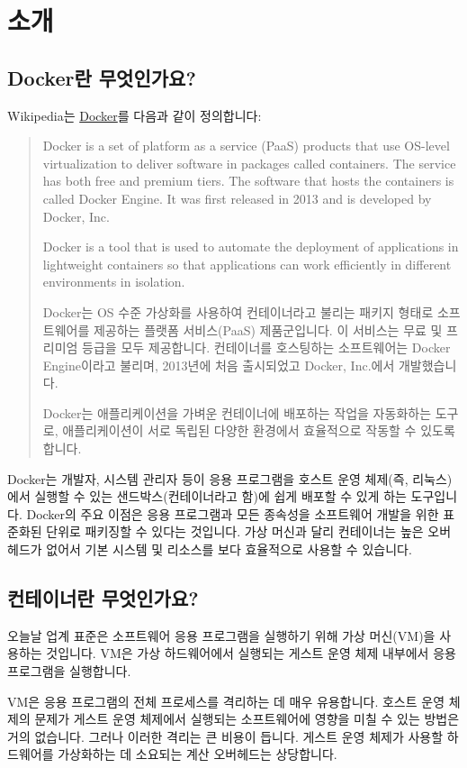 \chapter{소개}
\section{Docker란 무엇인가요?}
Wikipedia는 \href{https://www.docker.com/}{Docker}를 다음과 같이 정의합니다:
\begin{quote}
    Docker is a set of platform as a service (PaaS) products that use OS-level virtualization to deliver software in packages called containers. The service has both free and premium tiers. The software that hosts the containers is called Docker Engine. It was first released in 2013 and is developed by Docker, Inc.

    Docker is a tool that is used to automate the deployment of applications in lightweight containers so that applications can work efficiently in different environments in isolation.

    Docker는 OS 수준 가상화를 사용하여 컨테이너라고 불리는 패키지 형태로 소프트웨어를 제공하는 플랫폼 서비스(PaaS) 제품군입니다. 이 서비스는 무료 및 프리미엄 등급을 모두 제공합니다. 컨테이너를 호스팅하는 소프트웨어는 Docker Engine이라고 불리며, 2013년에 처음 출시되었고 Docker, Inc.에서 개발했습니다.
    
    Docker는 애플리케이션을 가벼운 컨테이너에 배포하는 작업을 자동화하는 도구로, 애플리케이션이 서로 독립된 다양한 환경에서 효율적으로 작동할 수 있도록 합니다.
\end{quote}

Docker는 개발자, 시스템 관리자 등이 응용 프로그램을 호스트 운영 체제(즉, 리눅스)에서 실행할 수 있는 샌드박스(컨테이너라고 함)에 쉽게 배포할 수 있게 하는 도구입니다. Docker의 주요 이점은 응용 프로그램과 모든 종속성을 소프트웨어 개발을 위한 표준화된 단위로 패키징할 수 있다는 것입니다. 가상 머신과 달리 컨테이너는 높은 오버헤드가 없어서 기본 시스템 및 리소스를 보다 효율적으로 사용할 수 있습니다.

\section{컨테이너란 무엇인가요?}
오늘날 업계 표준은 소프트웨어 응용 프로그램을 실행하기 위해 가상 머신(VM)을 사용하는 것입니다. VM은 가상 하드웨어에서 실행되는 게스트 운영 체제 내부에서 응용 프로그램을 실행합니다.

VM은 응용 프로그램의 전체 프로세스를 격리하는 데 매우 유용합니다. 호스트 운영 체제의 문제가 게스트 운영 체제에서 실행되는 소프트웨어에 영향을 미칠 수 있는 방법은 거의 없습니다. 그러나 이러한 격리는 큰 비용이 듭니다. 게스트 운영 체제가 사용할 하드웨어를 가상화하는 데 소요되는 계산 오버헤드는 상당합니다.

